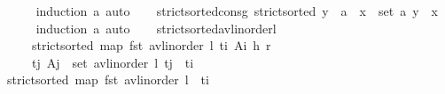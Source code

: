\begin{isabellebody}
%
\isadelimproof
\ \ \ \ %
\endisadelimproof
%
\isatagproof
{}\isamarkupfalse%
\ {\isacharparenleft}{\kern0pt}induction\ a{\isacharparenright}{\kern0pt}\ auto%
\endisatagproof
{\isafoldproof}%
%
\isadelimproof
\isanewline
%
\endisadelimproof
\isanewline
\ \ \isamarkupfalse%
\ strict{\isacharunderscore}{\kern0pt}sorted{\isacharunderscore}{\kern0pt}consg{\isacharcolon}{\kern0pt}\ {\isachardoublequoteopen}strict{\isacharunderscore}{\kern0pt}sorted\ {\isacharparenleft}{\kern0pt}y\ {\isacharhash}{\kern0pt}\ a{\isacharparenright}{\kern0pt}\ {\isasymLongrightarrow}\ {\isasymforall}x\ {\isasymin}\ set\ a{\isachardot}{\kern0pt}\ y\ {\isacharless}{\kern0pt}\ x{\isachardoublequoteclose}\isanewline
%
\isadelimproof
\ \ \ \ %
\endisadelimproof
%
\isatagproof
{}\isamarkupfalse%
\ {\isacharparenleft}{\kern0pt}induction\ a{\isacharparenright}{\kern0pt}\ auto%
\endisatagproof
{\isafoldproof}%
%
\isadelimproof
\isanewline
%
\endisadelimproof
\isanewline
\ \ \isamarkupfalse%
\ strict{\isacharunderscore}{\kern0pt}sorted{\isacharunderscore}{\kern0pt}avl{\isacharunderscore}{\kern0pt}inorder{\isacharunderscore}{\kern0pt}l{\isacharcolon}{\kern0pt}\isanewline
\ \ \ \ \ {\isachardoublequoteopen}strict{\isacharunderscore}{\kern0pt}sorted\ {\isacharparenleft}{\kern0pt}map\ fst\ {\isacharparenleft}{\kern0pt}avl{\isacharunderscore}{\kern0pt}inorder\ {\isasymlangle}l{\isacharcomma}{\kern0pt}\ {\isacharparenleft}{\kern0pt}{\isacharparenleft}{\kern0pt}t\isactrlsub i{\isacharcomma}{\kern0pt}\ A\isactrlsub i{\isacharparenright}{\kern0pt}{\isacharcomma}{\kern0pt}\ h{\isacharparenright}{\kern0pt}{\isacharcomma}{\kern0pt}\ r{\isasymrangle}{\isacharparenright}{\kern0pt}{\isacharparenright}{\kern0pt}{\isachardoublequoteclose}\isanewline
\ \ \ \ \ {\isachardoublequoteopen}{\isasymforall}{\isacharparenleft}{\kern0pt}t\isactrlsub j{\isacharcomma}{\kern0pt}\ A\isactrlsub j{\isacharparenright}{\kern0pt}\ {\isasymin}\ set\ {\isacharparenleft}{\kern0pt}avl{\isacharunderscore}{\kern0pt}inorder\ l{\isacharparenright}{\kern0pt}{\isachardot}{\kern0pt}\ t\isactrlsub j\ {\isacharless}{\kern0pt}\ t\isactrlsub i{\isachardoublequoteclose}\isanewline
%
\isadelimproof
\ \ %
\endisadelimproof
%
\isatagproof
{}\isamarkupfalse%
\ {\isacharminus}{\kern0pt}\isanewline
\ \ \ \ \isamarkupfalse%
\ {\isachardoublequoteopen}strict{\isacharunderscore}{\kern0pt}sorted\ {\isacharparenleft}{\kern0pt}map\ fst\ {\isacharparenleft}{\kern0pt}avl{\isacharunderscore}{\kern0pt}inorder\ l{\isacharparenright}{\kern0pt}\ {\isacharat}{\kern0pt}\ {\isacharbrackleft}{\kern0pt}t\isactrlsub i{\isacharbrackright}{\kern0pt}{\isacharparenright}{\kern0pt}{\isachardoublequoteclose}\isanewline

\end{isabellebody}
